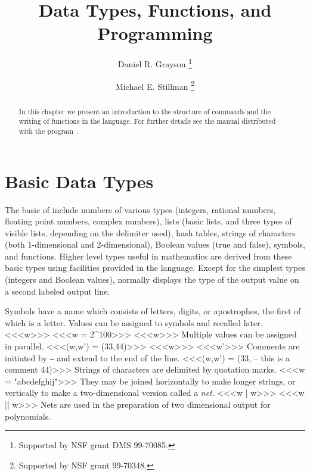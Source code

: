 \title{Data Types, Functions, and Programming}
\author{Daniel R. Grayson%
        \thanks{Supported by NSF grant DMS 99-70085.}
   \and Michael E. Stillman%
        \thanks{Supported by NSF grant 99-70348.}}

\maketitle

\begin{abstract}
  In this chapter we present an introduction to the structure of \Mtwo
  commands and the writing of functions in the \Mtwo language.  For further details
  see the \Mtwo manual distributed with the program~\cite{M2}.
\end{abstract}

\section{Basic Data Types}

The basic  of \Mtwo include numbers of various types (integers,
rational numbers, floating point numbers, complex numbers), lists (basic
lists, and three types of visible lists, depending on the delimiter used),
hash tables, strings of characters (both 1-dimensional and 2-dimensional),
Boolean values (true and false), symbols, and functions.  Higher level types
useful in mathematics are derived from these basic types using facilities
provided in the \Mtwo language.  Except for the simplest types (integers and
Boolean values), \Mtwo normally displays the type of the output value on a
second labeled output line.

Symbols have a name which consists of letters, digits, or apostrophes, the
first of which is a letter.  Values can be assigned to symbols and recalled
later.
<<<w>>>
<<<w = 2^100>>>
<<<w>>>
Multiple values can be assigned in parallel.
<<<(w,w') = (33,44)>>>
<<<w>>>
<<<w'>>>
Comments are initiated by {\tt --} and extend to the end of the line.
<<<(w,w') = (33,   -- this is a comment
          44)>>>
Strings of characters are delimited by quotation marks.
<<<w = "abcdefghij">>>
They may be joined horizontally to make longer strings, or vertically to make
a two-dimensional version called a {\sl net}.
<<<w | w>>>
<<<w || w>>>
Nets are used in the preparation of two dimensional output for polynomials.

